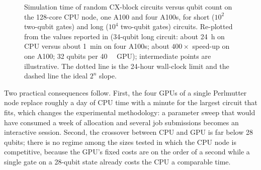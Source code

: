 \begin{figure}[htbp]
\centering
{}
\caption{Simulation time of random CX-block circuits versus qubit count on the 128-core CPU node, one A100 and four A100s, for short ($10^{2}$ two-qubit gates) and long ($10^{4}$ two-qubit gates) circuits. Re-plotted from the values reported in \cite{guo2025qgear} (34-qubit long circuit: about \SI{24}{\hour} on CPU versus about \SI{1}{\minute} on four A100s; about $400\times$ speed-up on one A100; 32 qubits per \SI{40}{\giga\byte} GPU); intermediate points are illustrative. The dotted line is the 24-hour wall-clock limit and the dashed line the ideal $2^{n}$ slope.}
\label{fig:qgear:cpu-gpu}
\end{figure}

Two practical consequences follow. First, the four GPUs of a single Perlmutter node replace roughly a day of CPU time with a minute for the largest circuit that fits, which changes the experimental methodology: a parameter sweep that would have consumed a week of allocation and several job submissions becomes an interactive session. Second, the crossover between CPU and GPU is far below 28 qubits; there is no regime among the sizes tested in which the CPU node is competitive, because the GPU's fixed costs are on the order of a second while a single gate on a 28-qubit state already costs the CPU a comparable time.

